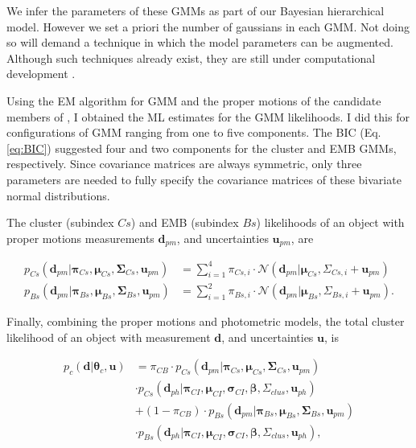 We infer the parameters of these GMMs as part of our Bayesian hierarchical model. However we set a priori the number of gaussians in each GMM. Not doing so will demand a technique in which the model parameters can be augmented. Although such techniques already exist, they are still under computational development \cite[see][for a review of reversible jump MCMC]{Fan2011}.

Using the EM algorithm for GMM and the proper motions of the candidate members of \citet{Bouy2015}, I obtained the ML estimates for the GMM likelihoods. I did this for configurations of GMM ranging from one to five components. The BIC (Eq. \ref{eq:BIC}) suggested four and two components for the cluster and EMB GMMs, respectively. Since covariance matrices are always symmetric, only three parameters are needed to fully specify the covariance matrices of these bivariate normal distributions.

The cluster (subindex $Cs$) and EMB (subindex $Bs$) likelihoods of an object with proper motions measurements $\mathbf{d}_{pm}$, and uncertainties $\mathbf{u}_{pm}$, are

\begin{align}
p_{Cs}(\mathbf{d}_{pm}| \boldsymbol{\pi}_{Cs}, \boldsymbol{\mu}_{Cs},\boldsymbol{\Sigma}_{Cs},\mathbf{u}_{pm})
&= \sum_{i=1}^4\pi_{Cs,i}\cdot \mathcal{N}(\mathbf{d}_{pm} | \boldsymbol{\mu}_{Cs},\Sigma_{Cs,i}+\mathbf{u}_{pm}) \nonumber\\
p_{Bs}(\mathbf{d}_{pm}| \boldsymbol{\pi}_{Bs}, \boldsymbol{\mu}_{Bs},\boldsymbol{\Sigma}_{Bs},\mathbf{u}_{pm})
&= \sum_{i=1}^2\pi_{Bs,i}\cdot \mathcal{N}(\mathbf{d}_{pm} | \boldsymbol{\mu}_{Bs},\Sigma_{Bs,i}+\mathbf{u}_{pm}).
\label{eq:lik-pm}
\end{align}

Finally, combining the proper motions and photometric models, the total cluster likelihood of an object with measurement $\mathbf{d}$, and uncertainties $\mathbf{u}$, is

\begin{align}
p_c(\mathbf{d}|\boldsymbol{\theta}_c,\mathbf{u})&=\pi_{CB}\cdot p_{Cs}(\mathbf{d}_{pm}| \boldsymbol{\pi}_{Cs}, \boldsymbol{\mu}_{Cs},\boldsymbol{\Sigma}_{Cs},\mathbf{u}_{pm}) \nonumber \\ &\cdot  p_{Cs}(\mathbf{d}_{ph}|\boldsymbol{\pi}_{CI},\boldsymbol{\mu}_{CI},\boldsymbol{\sigma}_{CI},\boldsymbol{\beta},\Sigma_{clus},\mathbf{u}_{ph})\nonumber\\
&+(1-\pi_{CB})\cdot p_{Bs}(\mathbf{d}_{pm}| \boldsymbol{\pi}_{Bs}, \boldsymbol{\mu}_{Bs},\boldsymbol{\Sigma}_{Bs},\mathbf{u}_{pm}) \nonumber \\
&\cdot  p_{Bs}(\mathbf{d}_{ph}|\boldsymbol{\pi}_{CI},\boldsymbol{\mu}_{CI},\boldsymbol{\sigma}_{CI}, \boldsymbol{\beta},\Sigma_{clus}, \mathbf{u}_{ph}),
\end{align}

